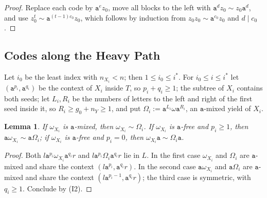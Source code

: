 \documentclass[11pt]{article}
\numberwithin{equation}{section}
\theoremstyle{plain}
\newtheorem{lemma}[theorem]{Lemma}
\theoremstyle{definition}
\theoremstyle{remark}
\theoremstyle{plain}
\begin{document}
\begin{proof}
Replace each code by $\mathtt a^ez_0$, move all blocks to the left with
$\mathtt a^dz_0\sim z_0\mathtt a^d$, and use $z_0^t\sim\mathtt a^{(t-1)c_0}z_0$,
which follows by induction from $z_0z_0\sim\mathtt a^{c_0}z_0$ and $d\mid c_0$.
\end{proof}

\subsection{Codes along the Heavy Path}

Let $i_0$ be the least index with $n_{X_i}<n$; then $1\le i_0\le i^*$.  For
$i_0\le i\le i^*$ let $(\mathtt a^{p_i},\mathtt a^{q_i})$ be the context of
$X_i$ inside $T$, so $p_i+q_i\ge1$; the subtree of $X_i$ contains both seeds;
let $L_i,R_i$ be the numbers of letters to the left and right of the first seed
inside it, so $R_i\ge g_0+n_Y\ge1$, and put $\Omega_i:=\mathtt a^{L_i}\omega\mathtt
a^{R_i}$, an $\mathtt a$-mixed yield of $X_i$.

\begin{lemma}
\label{lem:app-h-borrow}
If $\omega_{X_i}$ is $\mathtt a$-mixed, then $\omega_{X_i}\sim\Omega_i$.  If
$\omega_{X_i}$ is $\mathtt a$-free and $p_i\ge1$, then $\mathtt a\omega_{X_i}\sim\mathtt
a\Omega_i$; if $\omega_{X_i}$ is $\mathtt a$-free and $p_i=0$, then
$\omega_{X_i}\mathtt a\sim\Omega_i\mathtt a$.
\end{lemma}

\begin{proof}
Both $l\mathtt a^{p_i}\omega_{X_i}\mathtt a^{q_i}r$ and $l\mathtt a^{p_i}\Omega_i
\mathtt a^{q_i}r$ lie in $L$.  In the first case $\omega_{X_i}$ and $\Omega_i$ are
$\mathtt a$-mixed and share the context $(l\mathtt a^{p_i},\mathtt a^{q_i}r)$.  In the
second case $\mathtt a\omega_{X_i}$ and $\mathtt a\Omega_i$ are $\mathtt a$-mixed and
share the context $(l\mathtt a^{p_i-1},\mathtt a^{q_i}r)$; the third case is
symmetric, with $q_i\ge1$.  Conclude by (I2).
\end{proof}
\end{document}

